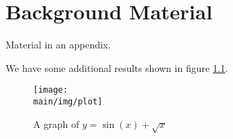 \documentclass[\main/thesis.tex]{subfiles}
\begin{document}
\chapter{Background Material}

Material in an appendix.

We have some additional results shown in figure \ref{fig:plot}.

\begin{figure}
    \centering
    \texttt{[image: \\main/img/plot]}
    \caption[A supporting figure] {A graph of $y = \sin(x) + \sqrt{x}$}
    \label{fig:plot}
\end{figure}
\end{document}

